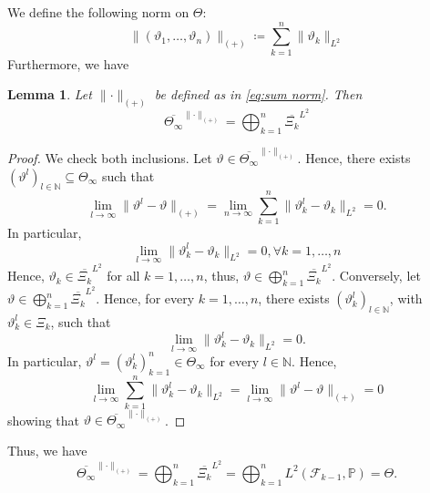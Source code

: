 \documentclass[11pt,a4paper,twoside,openany]{report}
\numberwithin{equation}{section}
\theoremstyle{plain} %
\newtheorem{lemma}[theorem]{Lemma}
\theoremstyle{definition} %
\theoremstyle{remark} %
\begin{document}
    
We define the following norm on \(\Theta\):
\begin{equation}\label{eq:sum norm}
    \lVert(\vartheta_1,\dots,\vartheta_{n})\rVert_{(+)}\coloneqq\sum_{k=1}^{n}\lVert \vartheta_k\rVert_{L^2}
\end{equation}
Furthermore, we have 
\begin{lemma}
    Let \(\lVert\cdot\rVert_{(+)}\) be defined as in \eqref{eq:sum norm}. Then 
    \begin{equation*}
        \overline{\Theta_{\infty}}^{\lVert\cdot\rVert_{(+)}}=\bigoplus_{k=1}^{n}\overline{\Xi_k}^{L^2}
    \end{equation*}
\end{lemma}
\begin{proof}
    We check both inclusions. Let \(\vartheta\in\overline{\Theta_{\infty}}^{\lVert\cdot\rVert_{(+)}}\). Hence, there exists \((\vartheta^l)_{l\in\mathbb{N}}\subseteq\Theta_{\infty}\) such that 
    \begin{equation*}
        \lim_{l\to\infty}\lVert \vartheta^l-\vartheta\rVert_{(+)}=\lim_{n\to\infty}\sum_{k=1}^n\lVert\vartheta^l_k-\vartheta_k\rVert_{L^2}=0.
    \end{equation*}
    In particular, 
    \begin{equation*}
        \lim_{l\to\infty}\lVert\vartheta^l_k-\vartheta_k\rVert_{L^2}=0,\forall k=1,\dots,n
    \end{equation*}
    Hence, \(\vartheta_k\in\overline{\Xi_k}^{L^2}\) for all \(k=1,\dots,n\), thus, \(\vartheta\in\bigoplus_{k=1}^{n}\overline{\Xi_k}^{L^2}\). Conversely, let \(\vartheta\in\bigoplus_{k=1}^{n}\overline{\Xi_k}^{L^2}\). Hence, for every \(k=1,\dots,n\), there exists \((\vartheta^l_k)_{l\in\mathbb{N}}\), with \(\vartheta^l_k\in\Xi_k\), such that 
    \begin{equation*}
    \lim_{l\to\infty}\lVert \vartheta^l_k-\vartheta_k\rVert_{L^2}=0.
    \end{equation*}
    In particular, \(\vartheta^l=(\vartheta^l_k)_{k=1}^n\in\Theta_{\infty}\) for every \(l\in\mathbb{N}\).
 Hence,
    \begin{equation*}
        \lim_{l\to\infty}\sum_{k=1}^n\lVert\vartheta^l_k-\vartheta_k\rVert_{L^2}=\lim_{l\to\infty}\lVert\vartheta^l-\vartheta\rVert_{(+)}=0
    \end{equation*}
    showing that \(\vartheta\in\overline{\Theta_{\infty}}^{\lVert\cdot\rVert_{(+)}}\).
\end{proof}
Thus, we have
\begin{equation*}
    \overline{\Theta_{\infty}}^{\lVert\cdot\rVert_{(+)}}=\bigoplus_{k=1}^{n}\overline{\Xi_k}^{L^2}=\bigoplus_{k=1}^{n}L^2(\mathcal{F}_{k-1},\mathbb{P})=\Theta.
\end{equation*}
\end{document}

